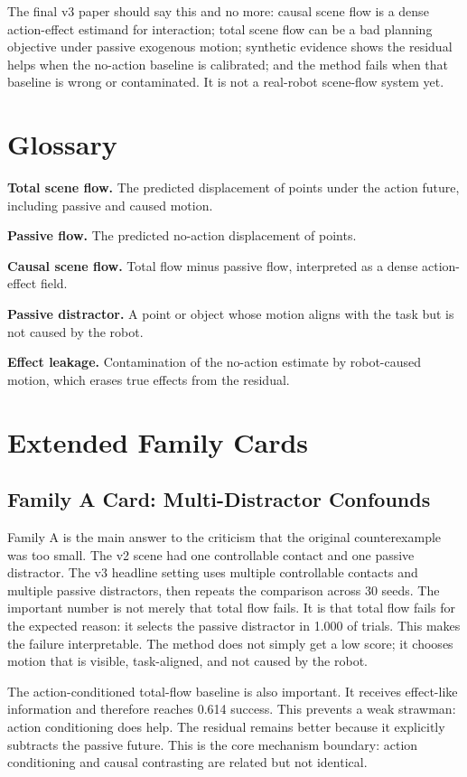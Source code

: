 \documentclass{article}
\begin{document}
The final v3 paper should say this and no more: causal scene flow is a dense
action-effect estimand for interaction; total scene flow can be a bad planning objective
under passive exogenous motion; synthetic evidence shows the residual helps when the
no-action baseline is calibrated; and the method fails when that baseline is wrong or
contaminated.  It is not a real-robot scene-flow system yet.

\section{Glossary}

\textbf{Total scene flow.} The predicted displacement of points under the action future,
including passive and caused motion.

\textbf{Passive flow.} The predicted no-action displacement of points.

\textbf{Causal scene flow.} Total flow minus passive flow, interpreted as a dense
action-effect field.

\textbf{Passive distractor.} A point or object whose motion aligns with the task but is
not caused by the robot.

\textbf{Effect leakage.} Contamination of the no-action estimate by robot-caused motion,
which erases true effects from the residual.

\section{Extended Family Cards}

\subsection{Family A Card: Multi-Distractor Confounds}

Family A is the main answer to the criticism that the original counterexample was too
small.  The v2 scene had one controllable contact and one passive distractor.  The v3
headline setting uses multiple controllable contacts and multiple passive distractors,
then repeats the comparison across 30 seeds.  The important number is not merely that
total flow fails.  It is that total flow fails for the expected reason: it selects the
passive distractor in 1.000 of trials.  This makes the failure interpretable.  The method
does not simply get a low score; it chooses motion that is visible, task-aligned, and not
caused by the robot.

The action-conditioned total-flow baseline is also important.  It receives effect-like
information and therefore reaches 0.614 success.  This prevents a weak strawman: action
conditioning does help.  The residual remains better because it explicitly subtracts the
passive future.  This is the core mechanism boundary: action conditioning and causal
contrasting are related but not identical.
\end{document}
